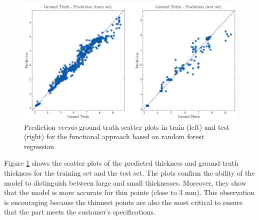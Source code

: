 \begin{figure}
\centering
\includegraphics[scale=0.48]{images/chapter_4/temporal_scatter.png}
\caption{Prediction \textit{versus} ground truth scatter plots in train (left) and test (right) for the functional approach based on random forest regression}
\label{fig:gt_prediction_functional}
\end{figure}

Figure \ref{fig:gt_prediction_functional} shows the scatter plots of the predicted thickness and ground-truth thickness for the training set and the test set. The plots confirm the ability of the modef to distinguish between large and small thicknesses. Moreover, they show that the model is more accurate for thin points  (close to 3 mm). This observation is encouraging because the thinnest points are also the most critical to ensure that the part meets the customer's specifications.


